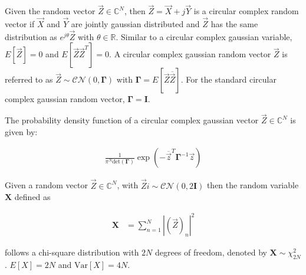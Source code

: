 \documentclass[a4paper, openany, oneside]{memoir}
\begin{document}
\begin{blockDefinition}
Given the random vector $\vec{Z} \in \mathbb{C}^N$, then $\vec{Z} = \vec{X} + j\vec{Y}$ is a circular complex random vector if $\vec{X}$ and $\vec{Y}$ are jointly gaussian distributed and $\vec{Z}$ has the same distribution as $e^{j\theta}\vec{Z}$ with $\theta \in \mathbb{R}$. Similar to a circular complex gaussian variable, $E\left[\vec{Z}\right] = 0$
and $E\left[\vec{Z}\vec{Z}^T\right] = 0$. A circular complex gaussian random vector $\vec{Z}$ is referred to as $\vec{Z} \sim \mathcal{CN}(0,\mathbf{\Gamma})$ with $\mathbf{\Gamma} = E\left[\vec{Z}\overline{\vec{Z}} \right]$. For the standard circular complex gaussian random vector, $\mathbf{\Gamma} = \mathbf{I}$. 

The probability density function of a circular complex gaussian vector $\vec{Z}\in \mathbb{C}^N$ is given by:

\begin{align*}
	\frac{1}{\pi^N \text{det}(\mathbf{\Gamma})} \exp \left(-\overline{\vec{z}}^T \mathbf{\Gamma}^{-1}\vec{z}\right)
\end{align*}
\end{blockDefinition}

\begin{blockDefinition}
Given a random vector $\vec{Z} \in \mathbb{C}^N$, with $\vec{Z}i \sim \mathcal{CN}(0, 2\mathbf{I})$ then the random variable $\mathbf{X}$ defined as

\begin{align*}
	\mathbf{X} &= \sum_{n=1}^N \left|(\vec{Z})_n\right|^2 %
\end{align*}






follows a chi-square distribution with $2N$ degrees of freedom, denoted by $\mathbf{X} \sim \chi^2_{2N}$.
$E[X] = 2N$ and $\text{Var}[X] = 4N$.
\end{blockDefinition}
\end{document}
